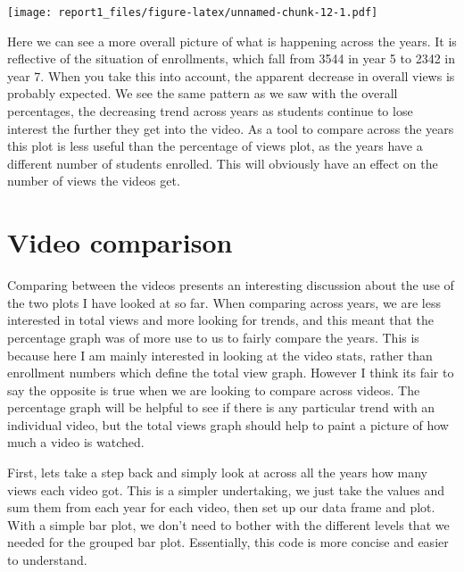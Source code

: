 \documentclass[
]{article}
\begin{document}
\texttt{[image: report1\_files/figure-latex/unnamed-chunk-12-1.pdf]}

Here we can see a more overall picture of what is happening across the
years. It is reflective of the situation of enrollments, which fall from
3544 in year 5 to 2342 in year 7. When you take this into account, the
apparent decrease in overall views is probably expected. We see the same
pattern as we saw with the overall percentages, the decreasing trend
across years as students continue to lose interest the further they get
into the video. As a tool to compare across the years this plot is less
useful than the percentage of views plot, as the years have a different
number of students enrolled. This will obviously have an effect on the
number of views the videos get.

\hypertarget{video-comparison}{%
\section{Video comparison}\label{video-comparison}}

Comparing between the videos presents an interesting discussion about
the use of the two plots I have looked at so far. When comparing across
years, we are less interested in total views and more looking for
trends, and this meant that the percentage graph was of more use to us
to fairly compare the years. This is because here I am mainly interested
in looking at the video stats, rather than enrollment numbers which
define the total view graph. However I think its fair to say the
opposite is true when we are looking to compare across videos. The
percentage graph will be helpful to see if there is any particular trend
with an individual video, but the total views graph should help to paint
a picture of how much a video is watched.

First, lets take a step back and simply look at across all the years how
many views each video got. This is a simpler undertaking, we just take
the values and sum them from each year for each video, then set up our
data frame and plot. With a simple bar plot, we don't need to bother
with the different levels that we needed for the grouped bar plot.
Essentially, this code is more concise and easier to understand.
\end{document}
